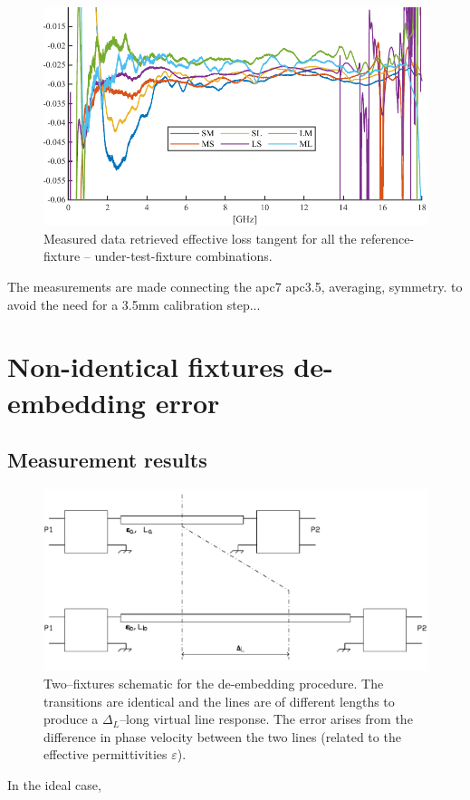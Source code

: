 \documentclass[11pt,a4paper]{article}
\begin{document}
    \begin{figure}[!tb]
        \includegraphics[width=\textwidth]{tandmeas}
        \caption{Measured data retrieved effective loss tangent for all the reference-fixture -- under-test-fixture combinations.}
        \label{fig:tandmeas}
    \end{figure}
    The measurements are made connecting the apc7 apc3.5, averaging, symmetry. to avoid the need for a 3.5mm calibration step...


    \section{Non-identical fixtures de-embedding error}
    \label{sec:error}

    \subsection{Measurement results}
    \label{subsec:measure-error}
    \begin{figure}[!tb]
        \includegraphics[width=\textwidth]{error}
        \caption{Two--fixtures schematic for the de-embedding procedure. The transitions are identical and the lines are
        of different lengths to produce a $\Delta_L$--long virtual line response. The error arises from the difference
        in phase velocity between the two lines (related to the effective permittivities $\varepsilon$).}
        \label{fig:error}
    \end{figure}
    In the ideal case,
\end{document}
